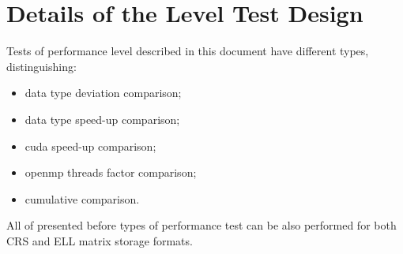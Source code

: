\chapter{Details of the Level Test Design} \label{chp:details-of-the-level-test-design}
	\begin{comment}
		Introduce the following subordinate sections. This section describes the features to be tested and any
		refinements to the test approach as required for the level. It also identifies the sets of test cases (highest
		level test cases) or scenarios along with the pass/fail criteria. It may also include the test deliverables.
	\end{comment}
	Tests of performance level described in this document have different types, distinguishing:
	\begin{itemize}
		\item data type deviation comparison;
		\item data type speed-up comparison;
		\item \gls{cuda} speed-up comparison;
		\item \gls{openmp} threads factor comparison;
		\item cumulative comparison.
	\end{itemize}
	All of presented before types of performance test can be also performed for both \gls{CRS} and \gls{ELL} matrix storage formats.
